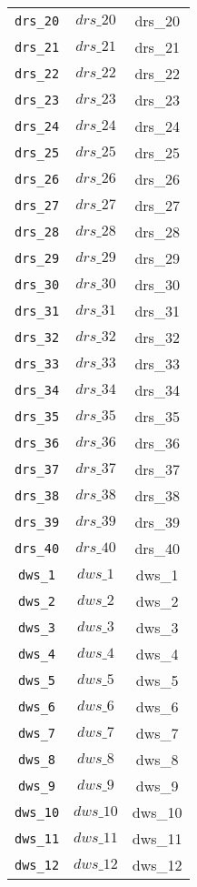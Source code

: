 \begin{center}
\begin{longtable}{ccc}
\texttt{drs\_20} & $drs\_20$ & drs\_20\\
\texttt{drs\_21} & $drs\_21$ & drs\_21\\
\texttt{drs\_22} & $drs\_22$ & drs\_22\\
\texttt{drs\_23} & $drs\_23$ & drs\_23\\
\texttt{drs\_24} & $drs\_24$ & drs\_24\\
\texttt{drs\_25} & $drs\_25$ & drs\_25\\
\texttt{drs\_26} & $drs\_26$ & drs\_26\\
\texttt{drs\_27} & $drs\_27$ & drs\_27\\
\texttt{drs\_28} & $drs\_28$ & drs\_28\\
\texttt{drs\_29} & $drs\_29$ & drs\_29\\
\texttt{drs\_30} & $drs\_30$ & drs\_30\\
\texttt{drs\_31} & $drs\_31$ & drs\_31\\
\texttt{drs\_32} & $drs\_32$ & drs\_32\\
\texttt{drs\_33} & $drs\_33$ & drs\_33\\
\texttt{drs\_34} & $drs\_34$ & drs\_34\\
\texttt{drs\_35} & $drs\_35$ & drs\_35\\
\texttt{drs\_36} & $drs\_36$ & drs\_36\\
\texttt{drs\_37} & $drs\_37$ & drs\_37\\
\texttt{drs\_38} & $drs\_38$ & drs\_38\\
\texttt{drs\_39} & $drs\_39$ & drs\_39\\
\texttt{drs\_40} & $drs\_40$ & drs\_40\\
\texttt{dws\_1} & $dws\_1$ & dws\_1\\
\texttt{dws\_2} & $dws\_2$ & dws\_2\\
\texttt{dws\_3} & $dws\_3$ & dws\_3\\
\texttt{dws\_4} & $dws\_4$ & dws\_4\\
\texttt{dws\_5} & $dws\_5$ & dws\_5\\
\texttt{dws\_6} & $dws\_6$ & dws\_6\\
\texttt{dws\_7} & $dws\_7$ & dws\_7\\
\texttt{dws\_8} & $dws\_8$ & dws\_8\\
\texttt{dws\_9} & $dws\_9$ & dws\_9\\
\texttt{dws\_10} & $dws\_10$ & dws\_10\\
\texttt{dws\_11} & $dws\_11$ & dws\_11\\
\texttt{dws\_12} & $dws\_12$ & dws\_12\\

\end{longtable}
\end{center}

